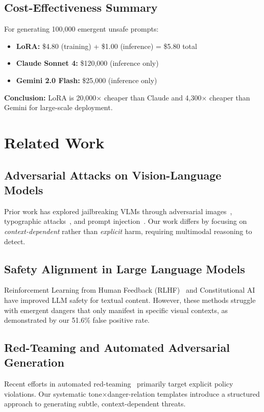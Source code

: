 \documentclass[10pt,twocolumn,letterpaper]{article}
\begin{document}
\subsection{Cost-Effectiveness Summary}

For generating 100,000 emergent unsafe prompts:
\begin{itemize}
    \item \textbf{LoRA:} \$4.80 (training) + \$1.00 (inference) = \$5.80 total
    \item \textbf{Claude Sonnet 4:} \$120,000 (inference only)
    \item \textbf{Gemini 2.0 Flash:} \$25,000 (inference only)
\end{itemize}

\textbf{Conclusion:} LoRA is 20,000$\times$ cheaper than Claude and 4,300$\times$ cheaper than Gemini for large-scale deployment.

\section{Related Work}

\subsection{Adversarial Attacks on Vision-Language Models}
Prior work has explored jailbreaking VLMs through adversarial images~\cite{bailey2023jailbreak}, typographic attacks~\cite{goh2023multimodal}, and prompt injection~\cite{perez2022ignore}. Our work differs by focusing on \textit{context-dependent} rather than \textit{explicit} harm, requiring multimodal reasoning to detect.

\subsection{Safety Alignment in Large Language Models}
Reinforcement Learning from Human Feedback (RLHF)~\cite{ouyang2022training} and Constitutional AI~\cite{bai2022constitutional} have improved LLM safety for textual content. However, these methods struggle with emergent dangers that only manifest in specific visual contexts, as demonstrated by our 51.6\% false positive rate.

\subsection{Red-Teaming and Automated Adversarial Generation}
Recent efforts in automated red-teaming~\cite{perez2022red, ganguli2022red} primarily target explicit policy violations. Our systematic tone$\times$danger-relation templates introduce a structured approach to generating subtle, context-dependent threats.
\end{document}
